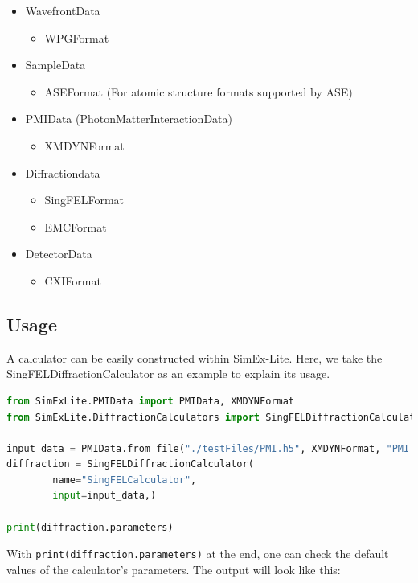 \documentclass[11pt, a4paper]{article}
\begin{document}
\begin{itemize}
    \item WavefrontData
    \begin{itemize}
        \item WPGFormat
    \end{itemize}
    \item SampleData
    \begin{itemize}
        \item ASEFormat (For atomic structure formats supported by ASE)
    \end{itemize}
    \item PMIData (PhotonMatterInteractionData)
    \begin{itemize}
        \item XMDYNFormat
    \end{itemize}
    \item Diffractiondata
        \begin{itemize}
            \item SingFELFormat
            \item EMCFormat
        \end{itemize}
    \item DetectorData
        \begin{itemize}
            \item CXIFormat
        \end{itemize}
\end{itemize}

\subsection{Usage}
A calculator can be easily constructed within SimEx-Lite. Here, we take the\\
SingFELDiffractionCalculator as an example to explain its usage.

\begin{lstlisting}[language=Python]
from SimExLite.PMIData import PMIData, XMDYNFormat
from SimExLite.DiffractionCalculators import SingFELDiffractionCalculator

input_data = PMIData.from_file("./testFiles/PMI.h5", XMDYNFormat, "PMI_data")
diffraction = SingFELDiffractionCalculator(
        name="SingFELCalculator",
        input=input_data,)

print(diffraction.parameters)
\end{lstlisting}

With \verb|print(diffraction.parameters)| at the end, one can check the default values of the calculator's parameters. The output will look like this:
\end{document}
